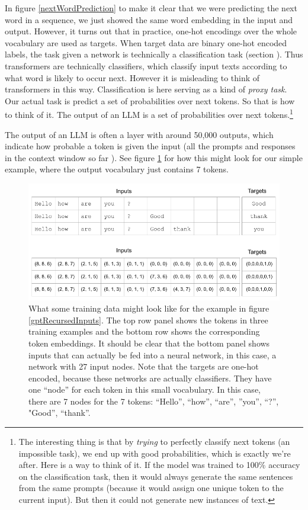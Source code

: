 In figure \ref{nextWordPrediction} to make it clear that we were predicting the next word in a sequence, we just showed the same word embedding in the input and output.  However, it turns out that in practice, one-hot encodings over the whole vocabulary are used as targets. When target data are binary one-hot encoded labels, the task given a network is technically a classification task (section ). Thus transformers are technically classifiers, which classify input texts according to what word is likely to occur next. However it is misleading to think of transformers in this way. Classification is here serving as a kind of \emph{proxy task}. Our actual task is predict a set of probabilities over next tokens.  So that is how to think of it. The output of an LLM is a set of probabilities over next tokens.\footnote{The interesting thing is that  by \emph{trying} to perfectly classify next tokens (an impossible task), we end up with good probabilities, which is exactly we're after. Here is a way to think of it. If the model was trained to 100\% accuracy on the classification task, then it would always generate the same sentences from the same prompts (because it would assign one unique token to the current input). But then it could not generate new instances of text.}

The output of an LLM is often a  layer with around 50,000 outputs,  which  indicate how probable a token is given the input (all the prompts and responses in the context window so far ). See figure \ref{contextWindow} for how this might look for our simple example, where the output vocabulary just contains 7 tokens.

\begin{figure}[h]
\centering
\includegraphics[scale=.45]{./images/contextWindow.png}
\caption[Jeff Yoshimi]{What some training data might look like for the example in figure \ref{gptRecursedInputs}. The top row panel shows the tokens in three training examples and the bottom row shows the corresponding token embeddings.  It should be clear that the bottom panel shows inputs that can actually be fed into a neural network, in this case, a network with 27 input nodes. Note that the targets are one-hot encoded, because these networks are actually classifiers. They have one ``node'' for each token in this small vocabulary. In this case, there are 7 nodes for the 7 tokens: ``Hello'', ``how'', ``are'', ''you'', ``?'', "Good'', ``thank''.  }
\label{contextWindow}
\end{figure}

